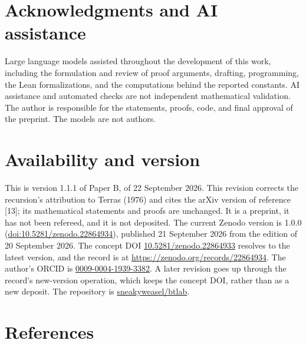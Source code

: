 \documentclass[11pt,a4paper]{article}
\begin{document}

\section{Acknowledgments and AI
assistance}\label{acknowledgments-and-ai-assistance}

Large language models assisted throughout the development of this work,
including the formulation and review of proof arguments, drafting,
programming, the Lean formalizations, and the computations behind the
reported constants. AI assistance and automated checks are not
independent mathematical validation. The author is responsible for the
statements, proofs, code, and final approval of the preprint. The models
are not authors.

\section{Availability and version}\label{availability-and-version}

This is version 1.1.1 of Paper B, of 22 September 2026. This revision
corrects the recursion's attribution to Terras (1976) and cites the
arXiv version of reference {[}13{]}; its mathematical statements and
proofs are unchanged. It is a preprint, it has not been refereed, and it
is not deposited. The current Zenodo version is 1.0.0
(\href{https://doi.org/10.5281/zenodo.22864934}{doi:10.5281/zenodo.22864934}),
published 21 September 2026 from the edition of 20 September 2026. The
concept DOI
\href{https://doi.org/10.5281/zenodo.22864933}{10.5281/zenodo.22864933}
resolves to the latest version, and the record is at
\url{https://zenodo.org/records/22864934}. The author's ORCID is
\href{https://orcid.org/0009-0004-1939-3382}{0009-0004-1939-3382}. A
later revision goes up through the record's new-version operation, which
keeps the concept DOI, rather than as a new deposit. The repository is
\href{https://github.com/sneakyweasel/btlab}{sneakyweasel/btlab}.

\section{References}\label{references}
\end{document}
